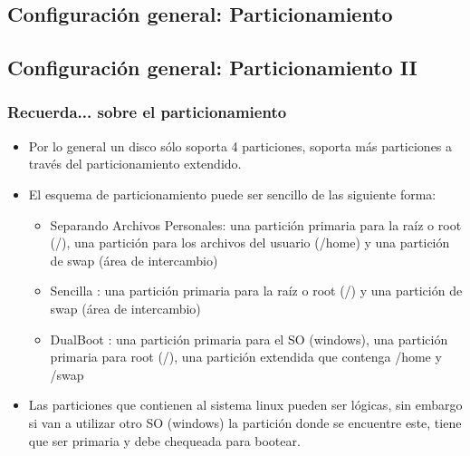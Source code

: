 \documentclass{beamer}
\begin{document}
\subsection{Configuraci\'on general: Particionamiento}

\subsection{Configuraci\'on general: Particionamiento II}
\begin{frame}
\frametitle{Recuerda... sobre el particionamiento}
\begin{itemize}
\item Por lo general un disco s\'olo soporta 4 particiones, soporta m\'as particiones a trav\'es del particionamiento extendido.
\item El esquema de particionamiento puede ser sencillo de las siguiente forma:
\begin{itemize}
\item \alert{Separando Archivos Personales:} una partici\'on primaria para la ra\'iz o root  (/), una partici\'on para los archivos del usuario (/home) y una partici\'on de swap (\'area de intercambio)
\item \alert{Sencilla :} una partici\'on primaria para la ra\'iz o root  (/) y una partici\'on de swap (\'area de intercambio)
\item \alert{DualBoot :} una partici\'on primaria para el SO (windows), una partici\'on primaria para root (/), una partici\'on extendida que contenga /home y /swap
\end{itemize}
\item Las particiones que contienen al sistema linux pueden ser l\'ogicas, sin embargo si van a utilizar otro SO (windows) la partici\'on donde se encuentre este, tiene que ser primaria y debe chequeada para bootear.
\end{itemize}
\end{frame}
\end{document}
